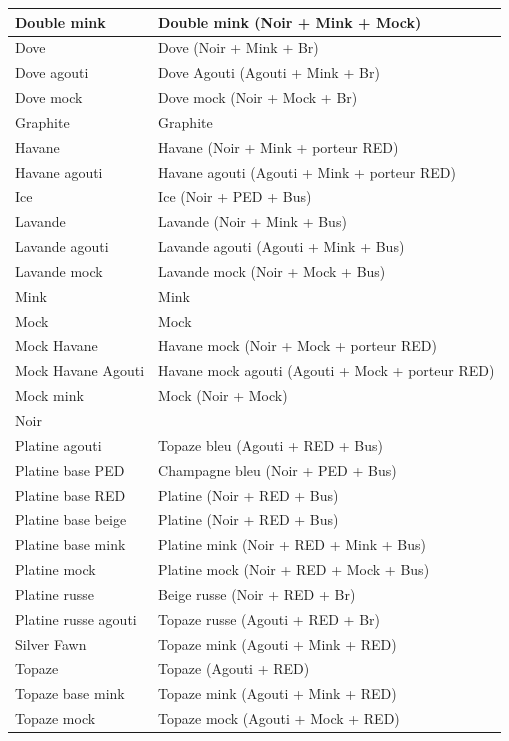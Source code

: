 \documentclass[a4paper,10pt]{article}
\begin{document}
\begin{center}
\begin{tabular}{|l|l|}
Double mink& Double mink (Noir + Mink + Mock)\\\hline
Dove& Dove (Noir + Mink + Br)\\\hline
Dove agouti& Dove Agouti (Agouti + Mink + Br)\\\hline
Dove mock& Dove mock (Noir + Mock + Br)\\\hline
Graphite& Graphite\\\hline
Havane& Havane (Noir + Mink + porteur RED)\\\hline
Havane agouti& Havane agouti (Agouti + Mink + porteur RED)\\\hline
Ice&  Ice (Noir + PED + Bus)\\\hline
Lavande& Lavande (Noir + Mink + Bus)\\\hline
Lavande agouti& Lavande agouti (Agouti + Mink + Bus)\\\hline
Lavande mock& Lavande mock (Noir + Mock + Bus)\\\hline
Mink& Mink \\\hline
Mock& Mock \\\hline
Mock Havane& Havane mock (Noir + Mock + porteur RED)\\\hline
Mock Havane Agouti& Havane mock agouti (Agouti + Mock + porteur RED)\\\hline
Mock mink& Mock (Noir + Mock)\\\hline
Noir& \\\hline
Platine agouti& Topaze bleu (Agouti + RED + Bus)\\\hline
Platine base PED& Champagne bleu (Noir + PED + Bus)\\\hline
Platine base RED& Platine (Noir + RED + Bus)\\\hline
Platine base beige& Platine (Noir + RED + Bus)\\\hline
Platine base mink& Platine mink (Noir + RED + Mink + Bus)\\\hline
Platine mock& Platine mock (Noir + RED + Mock + Bus)\\\hline
Platine russe& Beige russe (Noir + RED + Br)\\\hline
Platine russe agouti& Topaze russe (Agouti + RED + Br)\\\hline
Silver Fawn& Topaze mink (Agouti + Mink + RED)\\\hline
Topaze& Topaze (Agouti + RED)\\\hline
Topaze base mink& Topaze mink (Agouti + Mink + RED)\\\hline
Topaze mock& Topaze mock (Agouti + Mock + RED)\\\hline
\end{tabular}\end{center}
\end{document}

